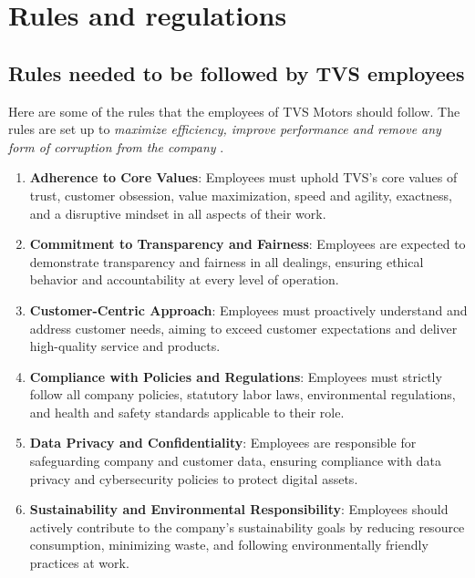 \section{Rules and regulations}

\subsection{Rules needed to be followed by TVS employees}

	Here are some of the rules that the employees of TVS Motors should follow. The rules are set up to \textit{maximize efficiency, improve performance and remove any form of corruption from the company }\cite{TVS_ANNUAL_REPORT}. 

\begin{enumerate}
	\item \textbf{Adherence to Core Values}: Employees must uphold TVS's core values of trust, customer obsession, value maximization, speed and agility, exactness, and a disruptive mindset in all aspects of their work.
	
	\item \textbf{Commitment to Transparency and Fairness}: Employees are expected to demonstrate transparency and fairness in all dealings, ensuring ethical behavior and accountability at every level of operation.
	
	\item \textbf{Customer-Centric Approach}: Employees must proactively understand and address customer needs, aiming to exceed customer expectations and deliver high-quality service and products.
	
	\item \textbf{Compliance with Policies and Regulations}: Employees must strictly follow all company policies, statutory labor laws, environmental regulations, and health and safety standards applicable to their role.
	
	\item \textbf{Data Privacy and Confidentiality}: Employees are responsible for safeguarding company and customer data, ensuring compliance with data privacy and cybersecurity policies to protect digital assets.
	
	\item \textbf{Sustainability and Environmental Responsibility}: Employees should actively contribute to the company’s sustainability goals by reducing resource consumption, minimizing waste, and following environmentally friendly practices at work.
	

\end{enumerate}
